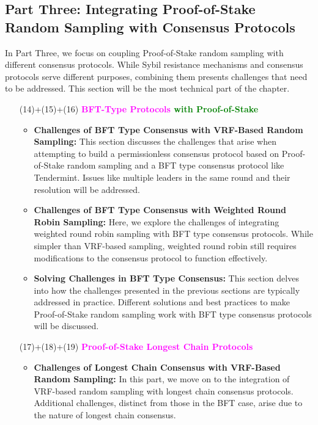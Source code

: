 \subsection{Part Three: Integrating Proof-of-Stake Random Sampling with Consensus Protocols}
In Part Three, we focus on coupling Proof-of-Stake random sampling with different consensus protocols. While Sybil resistance mechanisms and consensus protocols serve different purposes, combining them presents challenges that need to be addressed. This section will be the most technical part of the chapter.
\begin{enumerate}[label=(\arabic*)]
    \item[(14)+(15)+(16)] \textbf{\textcolor{magenta}{BFT-Type Protocols} \textcolor{green}{with Proof-of-Stake}}

    \begin{itemize}
      \item \textbf{Challenges of BFT Type Consensus with VRF-Based Random Sampling:} This section discusses the challenges that arise when attempting to build a permissionless consensus protocol based on Proof-of-Stake random sampling and a BFT type consensus protocol like Tendermint. Issues like multiple leaders in the same round and their resolution will be addressed.
    
      \item \textbf{Challenges of BFT Type Consensus with Weighted Round Robin Sampling:} Here, we explore the challenges of integrating weighted round robin sampling with BFT type consensus protocols. While simpler than VRF-based sampling, weighted round robin still requires modifications to the consensus protocol to function effectively.
    
      \item \textbf{Solving Challenges in BFT Type Consensus:} This section delves into how the challenges presented in the previous sections are typically addressed in practice. Different solutions and best practices to make Proof-of-Stake random sampling work with BFT type consensus protocols will be discussed.
    
    \end{itemize}

    \item[(17)+(18)+(19)] \textcolor{magenta}{\textbf{Proof-of-Stake Longest Chain Protocols}}

    \begin{itemize}
      \item \textbf{Challenges of Longest Chain Consensus with VRF-Based Random Sampling:} In this part, we move on to the integration of VRF-based random sampling with longest chain consensus protocols. Additional challenges, distinct from those in the BFT case, arise due to the nature of longest chain consensus.
    

\end{itemize}
\end{enumerate}
